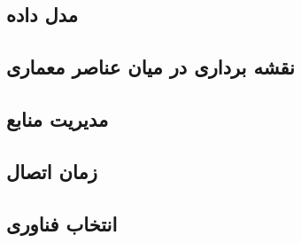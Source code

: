 \subsection{مدل داده}
\subsection{نقشه برداری در میان عناصر معماری}
\subsection{مدیریت منابع}
\subsection{زمان اتصال}
\subsection{انتخاب فناوری}
